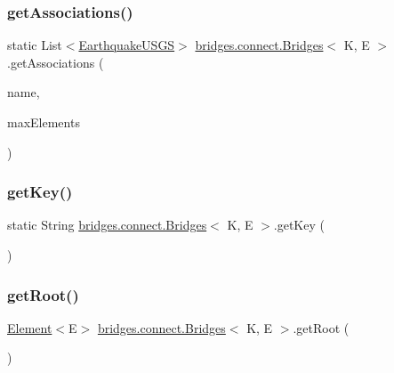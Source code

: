 \subsubsection{\texorpdfstring{get\+Associations()}{getAssociations()}\hspace{0.1cm}{\footnotesize\ttfamily [2/2]}}
{\footnotesize\ttfamily static List$<$\hyperlink{classbridges_1_1data__src__dependent_1_1_earthquake_u_s_g_s}{Earthquake\+U\+S\+GS}$>$ \hyperlink{classbridges_1_1connect_1_1_bridges}{bridges.\+connect.\+Bridges}$<$ K, E $>$.get\+Associations (\begin{DoxyParamCaption}\item[{\hyperlink{classbridges_1_1data__src__dependent_1_1_u_s_g_saccount}{U\+S\+G\+Saccount}}]{name,  }\item[{int}]{max\+Elements }\end{DoxyParamCaption})\hspace{0.3cm}{\ttfamily [static]}}

\hypertarget{classbridges_1_1connect_1_1_bridges_a813a1783f7b547fdb964f8af87c66f4b}{}\label{classbridges_1_1connect_1_1_bridges_a813a1783f7b547fdb964f8af87c66f4b} 
\subsubsection{\texorpdfstring{get\+Key()}{getKey()}}
{\footnotesize\ttfamily static String \hyperlink{classbridges_1_1connect_1_1_bridges}{bridges.\+connect.\+Bridges}$<$ K, E $>$.get\+Key (\begin{DoxyParamCaption}{ }\end{DoxyParamCaption})\hspace{0.3cm}{\ttfamily [static]}}

\hypertarget{classbridges_1_1connect_1_1_bridges_ad46be93cba155fa93fd9082d9d813466}{}\label{classbridges_1_1connect_1_1_bridges_ad46be93cba155fa93fd9082d9d813466} 
\subsubsection{\texorpdfstring{get\+Root()}{getRoot()}}
{\footnotesize\ttfamily \hyperlink{classbridges_1_1base_1_1_element}{Element}$<$E$>$ \hyperlink{classbridges_1_1connect_1_1_bridges}{bridges.\+connect.\+Bridges}$<$ K, E $>$.get\+Root (\begin{DoxyParamCaption}{ }\end{DoxyParamCaption})}


